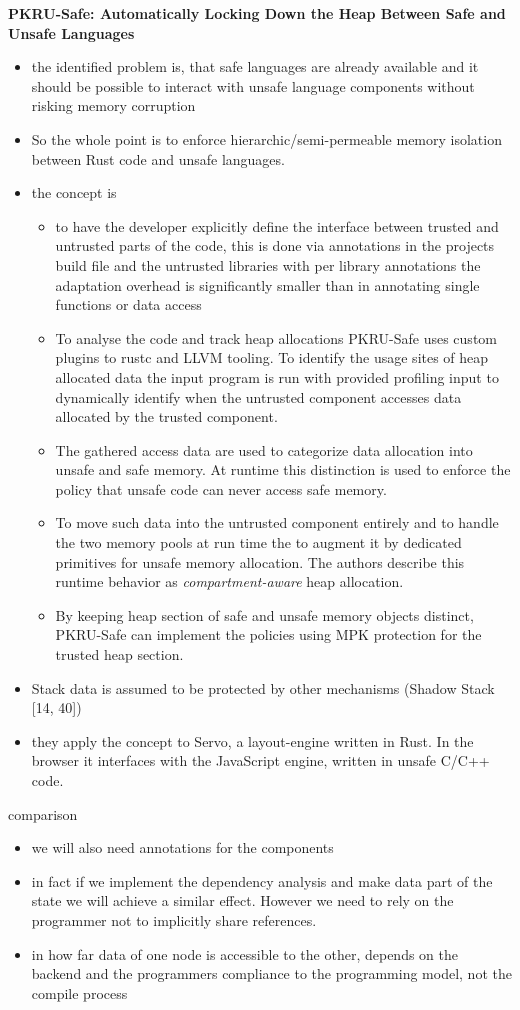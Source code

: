  \textbf{PKRU-Safe: Automatically Locking Down the Heap
Between Safe and Unsafe Languages}\cite{kirth2022pkru}
\begin{itemize}
    \item the identified problem is, that safe languages are already available and it should be possible to interact with unsafe language components without risking memory corruption
    \item So the whole point is to enforce hierarchic/semi-permeable memory isolation between Rust code and unsafe languages.
    \item the concept is 
    \begin{itemize}
        \item to have the developer explicitly define the interface between trusted and untrusted parts of the code, this is done via annotations in the projects build file and the untrusted libraries \means with per library annotations the adaptation overhead is significantly smaller than in annotating single functions or data access
        \item To analyse the code and track heap allocations PKRU-Safe uses custom plugins to rustc and LLVM tooling. To identify the usage sites of heap allocated data the input program is run with provided profiling input to dynamically identify when the untrusted component accesses data allocated by the trusted component.
        \item The gathered access data are used to categorize data allocation into unsafe and safe memory. At runtime this distinction is used to enforce the policy that unsafe code can never access safe memory.
        \item To move such data into the untrusted component entirely and to handle the two memory pools at run time the  to augment it by dedicated primitives for unsafe memory allocation. The authors describe this runtime behavior as \emph{compartment-aware} heap allocation. 
        \item By keeping heap section of safe and unsafe memory objects distinct, PKRU-Safe can implement the policies using MPK protection for the trusted heap section.
    \end{itemize}
    \item Stack data is assumed to be protected by other mechanisms (Shadow Stack [14, 40])
    \item they apply the concept to Servo, a layout-engine written in Rust. In the browser it interfaces with the JavaScript engine, written in unsafe C/C++ code.  
\end{itemize}
comparison
\begin{itemize}
    \item we will also need annotations for the components
    \item in fact if we implement the dependency analysis and make data part of the state we will achieve a similar effect. However we need to rely on the programmer not to implicitly share references.
    \item in how far data of one node is accessible to the other, depends on the backend and the programmers compliance to the programming model, not the compile process 
\end{itemize}


